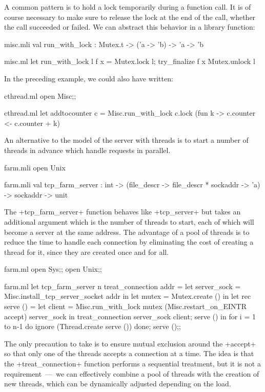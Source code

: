 A common pattern is to hold a lock temporarily during a function call.
It is of course necessary to make sure to release the lock at the end
of the call, whether the call succeeded or failed. We can abstract
this behavior in a library function:
\begin{codefile}{misc.mli}
val run_with_lock : Mutex.t -> ('a -> 'b) -> 'a -> 'b
\end{codefile}
\begin{listingcodefile}{misc.ml}
let run_with_lock l f x = 
  Mutex.lock l; try_finalize f x Mutex.unlock l
\end{listingcodefile}
In the preceding example, we could also have written:
\begin{codefile}{cthread.ml}
open Misc;;
\end{codefile}
\begin{listingcodefile}{cthread.ml}
let addtocounter c =
  Misc.run_with_lock c.lock (fun k -> c.counter <- c.counter + k)
\end{listingcodefile}

\begin{example}
An alternative to the model of the server with threads is to start a
number of threads in advance which handle requests in parallel.
%
\begin{codefile}{farm.mli}
open Unix
\end{codefile}
%
\begin{listingcodefile}{farm.mli}
val tcp_farm_server : 
  int -> (file_descr -> file_descr * sockaddr -> 'a) -> sockaddr -> unit
\end{listingcodefile}
%
The \ml+tcp_farm_server+ function behaves like \ml+tcp_server+ but
takes an additional argument which is the number of threads to start,
each of which will become a server at the same address. The advantage
of a pool of threads is to reduce the time to handle each connection
by eliminating the cost of creating a thread for it, since they are
created once and for all.
%
\begin{codefile}{farm.ml}
open Sys;;
open Unix;;
\end{codefile}
%
\begin{listingcodefile}{farm.ml}
let tcp_farm_server n treat_connection addr = 
  let server_sock = Misc.install_tcp_server_socket addr in 
  let mutex = Mutex.create () in
  let rec serve () =
    let client = 
      Misc.run_with_lock mutex 
        (Misc.restart_on_EINTR accept) server_sock in
    treat_connection server_sock client;
    serve () in
  for i = 1 to n-1 do ignore (Thread.create serve ()) done;
  serve ();;
\end{listingcodefile}
The only precaution to take is to ensure mutual exclusion around the
\ml+accept+ so that only one of the threads accepts a connection at a
time. The idea is that the \ml+treat_connection+ function performs a
sequential treatment, but it is not a requirement~---~we can
effectively combine a pool of threads with the creation of new
threads, which can be dynamically adjusted depending on the load.
\end{example}

